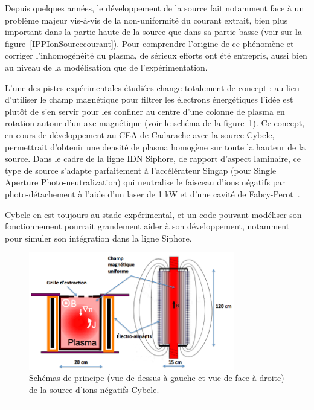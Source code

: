 \begin{refsection}
Depuis quelques années, le développement de la source fait notamment 
face à un problème majeur vis-à-vis de la non-uniformité du courant extrait, bien plus
important dans la partie haute de la source que dans sa partie basse (voir sur la
figure~\ref{IPPIonSourcecourant}). 
Pour comprendre l'origine de ce phénomène et corriger l'inhomogénéité du plasma,
de sérieux efforts ont été entrepris, aussi bien au niveau de la modélisation que
de l'expérimentation. 

L'une des pistes expérimentales étudiées change totalement de concept : au
lieu d'utiliser le champ magnétique pour filtrer les électrons énergétiques
l'idée est plutôt de s'en servir pour les confiner au centre d'une colonne de
plasma en rotation autour d'un axe magnétique (voir le schéma de la
figure~\ref{CYBELEIonSource}). Ce concept, en cours de développement au CEA de Cadarache avec la source Cybele, permettrait
d'obtenir une densité de plasma homogène sur toute la hauteur de la source. Dans
le cadre de la ligne IDN Siphore, de rapport d'aspect laminaire, ce type de
source s'adapte parfaitement à l'accélérateur Singap (pour Single Aperture
Photo-neutralization) qui neutralise le faisceau d'ions négatifs par
photo-détachement à l'aide d'un laser de 1 kW et d'une cavité de
Fabry-Perot~\parencite{SimoninHDR}.

Cybele en est toujours au stade expérimental, et un
code pouvant modéliser son fonctionnement pourrait grandement aider à son
développement, notamment pour simuler son intégration dans la ligne Siphore.

\begin{figure}[htbp]
\centering
\includegraphics[width=0.8\textwidth]{figures/sourceSimonin1.png}
{\caption{Schémas de principe (vue de dessus à gauche et vue de face à droite)
de la source d'ions négatifs Cybele.}\label{CYBELEIonSource}}
\end{figure}


\begin{center}
\rule{0.6\textwidth}{1pt}
\end{center}


\end{refsection}

